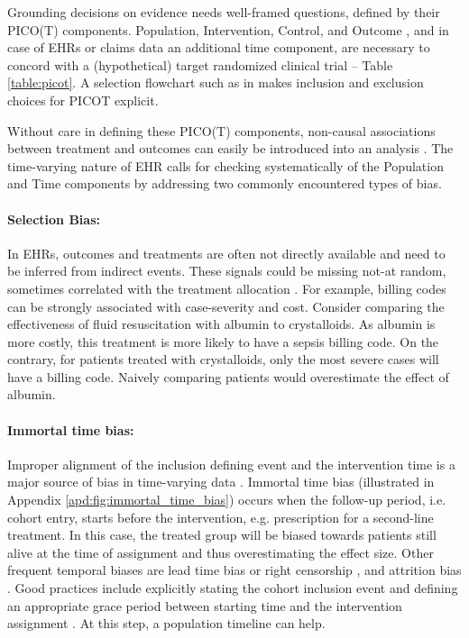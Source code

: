 \documentclass[10pt,letterpaper]{article}
\begin{document}
Grounding decisions on evidence needs well-framed questions, defined by their
PICO(T) components. Population, Intervention, Control, and Outcome
\cite{richardson1995well,riva2012your}, and in case of EHRs or claims data an
additional time component, are necessary to concord with a (hypothetical) target
randomized clinical trial \cite{hernan_using_2016,wang2023emulation} -- Table
\ref{table:picot}. A selection flowchart such as in
 makes inclusion and exclusion choices for PICOT explicit.

Without care in defining these PICO(T) components, non-causal associations
between treatment and outcomes can easily be introduced into an analysis
\cite{catalogofbias}. The time-varying nature of EHR calls for checking
systematically of the Population and Time components by addressing two commonly
encountered types of bias.


\paragraph{Selection Bias:} In EHRs, outcomes and treatments are often not
directly available and need to be inferred from indirect events. These signals
could be missing not-at random, sometimes correlated with the treatment
allocation \cite{weiskopf2023healthcare}. For example, billing codes can be
strongly associated with case-severity and cost. Consider comparing the
effectiveness of fluid resuscitation with albumin to crystalloids. As albumin is
more costly, this treatment is more likely to have a sepsis billing code. On the
contrary, for patients treated with crystalloids, only the most severe cases
will have a billing code. Naively comparing patients would overestimate the
effect of albumin.

\paragraph{Immortal time bias:} Improper alignment of the inclusion defining
event and the intervention time is a major source of bias in time-varying data
\cite{suissa2008immortal,hernan2016specifying,wang2022understanding}. Immortal time bias (illustrated in
Appendix \ref{apd:fig:immortal_time_bias}) occurs when the follow-up period,
i.e. cohort entry, starts before the intervention, e.g. prescription for a
second-line treatment. In this case, the treated group will be biased towards
patients still alive at the time of assignment and thus overestimating the
effect size. Other frequent temporal biases are lead time bias
\cite{Oke2021leadtimebias,fu2021timing} or right censorship  \cite{hernan2016specifying}, and attrition bias
\cite{Bankhead2017attritionbias}. Good
practices include explicitly stating the cohort inclusion event   \cite[Chapter~10:Defining Cohorts]{ohdsi2019book} and defining
an appropriate grace period between starting time and the intervention
assignment \cite{hernan2016specifying}. At this step, a population timeline can
help.
\end{document}
